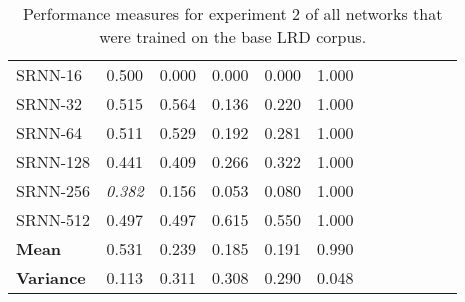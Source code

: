\begin{table}
\begin{tabularx}{\textwidth}{@{}l*{10}{C}c@{}}
  SRNN-16 &     0.500 &      0.000 &   0.000 &     0.000 &    1.000 \\
  SRNN-32 &     0.515 &      0.564 &   0.136 &     0.220 &    1.000 \\
  SRNN-64 &     0.511 &      0.529 &   0.192 &     0.281 &    1.000 \\
 SRNN-128 &     0.441 &      0.409 &   0.266 &     0.322 &    1.000 \\
 SRNN-256 &     \textit{0.382} &      0.156 &   0.053 &     0.080 &    1.000 \\
 SRNN-512 &     0.497 &      0.497 &   0.615 &     0.550 &    1.000 \\
 \midrule
 \midrule
 \textbf{Mean} & 0.531 & 0.239 & 0.185 & 0.191 & 0.990 \\
 \textbf{Variance} & 0.113 & 0.311 & 0.308 & 0.290 & 0.048 \\
\bottomrule
\end{tabularx}
\caption[Base LRD trained network performance on experiment 2]{Performance measures for experiment 2 of all networks that were trained on the base LRD corpus.}
\label{tab:perf_NDbase}
\end{table}